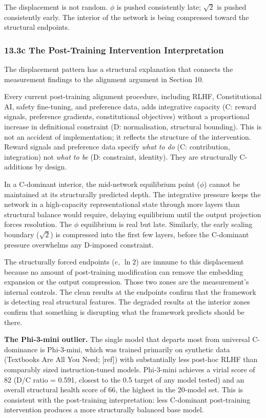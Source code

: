 \documentclass[
  11pt,
  letterpaper,
]{article}
\begin{document}
The displacement is not random. \(\phi\) is pushed consistently late;
\(\sqrt{2}\) is pushed consistently early. The interior of the network
is being compressed toward the structural endpoints.

\subsubsection{13.3c The Post-Training Intervention
Interpretation}\label{c-the-post-training-intervention-interpretation}

The displacement pattern has a structural explanation that connects the
measurement findings to the alignment argument in Section 10.

Every current post-training alignment procedure, including RLHF,
Constitutional AI, safety fine-tuning, and preference data, adds
integrative capacity (C: reward signals, preference gradients,
constitutional objectives) without a proportional increase in
definitional constraint (D: normalisation, structural bounding). This is
not an accident of implementation; it reflects the structure of the
intervention. Reward signals and preference data specify \emph{what to
do} (C: contribution, integration) not \emph{what to be} (D: constraint,
identity). They are structurally C-additions by design.

In a C-dominant interior, the mid-network equilibrium point (\(\phi\))
cannot be maintained at its structurally predicted depth. The
integrative pressure keeps the network in a high-capacity
representational state through more layers than structural balance would
require, delaying equilibrium until the output projection forces
resolution. The \(\phi\) equilibrium is real but late. Similarly, the
early scaling boundary (\(\sqrt{2}\)) is compressed into the first few
layers, before the C-dominant pressure overwhelms any D-imposed
constraint.

The structurally forced endpoints (\(e\), \(\ln 2\)) are immune to this
displacement because no amount of post-training modification can remove
the embedding expansion or the output compression. Those two zones are
the measurement's internal controls. The clean results at the endpoints
confirm that the framework is detecting real structural features. The
degraded results at the interior zones confirm that something is
disrupting what the framework predicts should be there.

\textbf{The Phi-3-mini outlier.} The single model that departs most from
universal C-dominance is Phi-3-mini, which was trained primarily on
synthetic data (Textbooks Are All You Need; {[}ref{]}) with
substantially less post-hoc RLHF than comparably sized instruction-tuned
models. Phi-3-mini achieves a virial score of 82 (D/C ratio = 0.591,
closest to the 0.5 target of any model tested) and an overall structural
health score of 66, the highest in the 20-model set. This is consistent
with the post-training interpretation: less C-dominant post-training
intervention produces a more structurally balanced base model.
\end{document}
